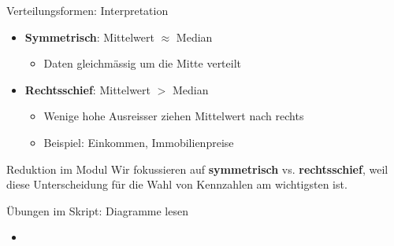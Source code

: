 \begin{frame}{Verteilungsformen: Interpretation}
    \begin{itemize}[<+->]
        \item \textbf{Symmetrisch}: Mittelwert $\approx$ Median
              \begin{itemize}
                  \item Daten gleichmässig um die Mitte verteilt
              \end{itemize}
        \item \textbf{Rechtsschief}: Mittelwert $>$ Median
              \begin{itemize}
                  \item Wenige hohe Ausreisser ziehen Mittelwert nach rechts
                  \item Beispiel: Einkommen, Immobilienpreise
              \end{itemize}
    \end{itemize}

    \vspace{0.5em}
    \begin{block}{Reduktion im Modul}
        Wir fokussieren auf \textbf{symmetrisch} vs. \textbf{rechtsschief}, weil diese Unterscheidung für die Wahl von Kennzahlen am wichtigsten ist.
    \end{block}
\end{frame}



\begin{frame}{Übungen im Skript: Diagramme lesen}
    \begin{itemize}
        \item {}
    \end{itemize}
\end{frame}

